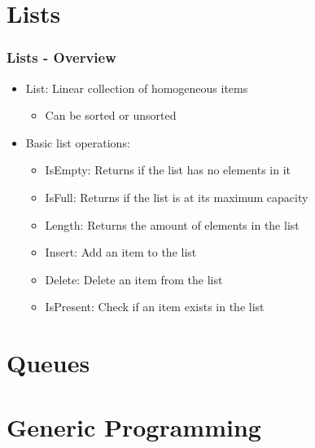 \documentclass[c, aspectratio=169]{beamer}
\begin{document}
\section{Lists}
\begin{frame}\frametitle{Lists - Overview}
\begin{itemize}
\item List: Linear collection of homogeneous items
	\begin{itemize}
	\item Can be sorted or unsorted
	\end{itemize}
\item Basic list operations:
	\begin{itemize}
	\item IsEmpty: Returns if the list has no elements in it
	\item IsFull: Returns if the list is at its maximum capacity
	\item Length: Returns the amount of elements in the list
	\item Insert: Add an item to the list
	\item Delete: Delete an item from the list
	\item IsPresent: Check if an item exists in the list
	\end{itemize}
\end{itemize}
\end{frame}

\begin{frame}\end{frame}
\begin{frame}\end{frame}

\section{Queues}
\begin{frame}\end{frame}
\begin{frame}\end{frame}
\begin{frame}\end{frame}

\section{Generic Programming}
\begin{frame}\end{frame}
\begin{frame}\end{frame}
\begin{frame}\end{frame}
\end{document}
